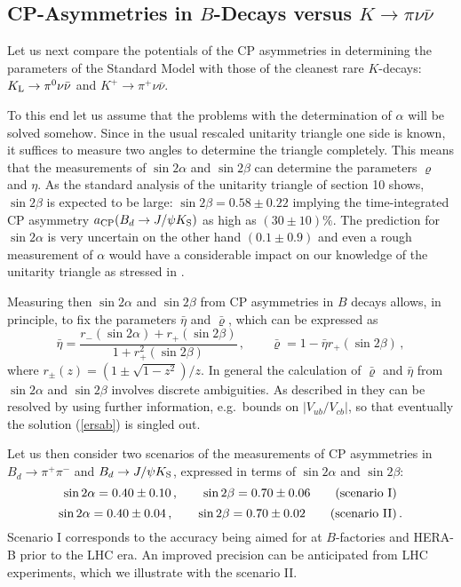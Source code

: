 \subsection{CP-Asymmetries in $B$-Decays versus $K \to \pi \nu\bar\nu$}
Let us next compare the potentials of the CP asymmetries in
determining the parameters of the Standard Model with those
of the cleanest rare $K$-decays: $K_{\rm L}\to\pi^0\nu\bar\nu$ and
$K^+\to\pi^+\nu\bar\nu$.

To this end let us assume that the problems with the determination
of $\alpha$ will be solved somehow. Since in the usual rescaled 
unitarity triangle  one side is known, it suffices to measure
two angles to determine the triangle completely. This means that
the measurements of $\sin 2\alpha$ and $\sin 2\beta$ can determine
the parameters $\varrho$ and $\eta$.
As the standard analysis of the unitarity triangle of section 10
shows, $\sin 2\beta$ is expected to be large: $\sin 2\beta=0.58\pm 0.22$
implying the time-integrated CP asymmetry  
$a_{\rm CP}(B_d\to J/\psi K_{\rm S})$
as high as $(30 \pm 10)\%$.
The prediction for $\sin 2\alpha$ is very
uncertain on the other hand $(0.1\pm0.9)$ and even a rough measurement
of $\alpha$ would have a considerable impact on our knowledge of
the unitarity triangle as stressed in \cite{BLO,BB96}.

Measuring then $\sin 2\alpha$ and $\sin 2\beta$ from CP asymmetries in
$B$ decays allows, in principle, to fix the 
parameters $\bar\eta$ and $\bar\varrho$, which can be expressed as
\cite{AJB94}
\begin{equation}\label{ersab}
\bar\eta=\frac{r_-(\sin 2\alpha)+r_+(\sin 2\beta)}{1+
r^2_+(\sin 2\beta)}\,,\qquad
\bar\varrho=1-\bar\eta r_+(\sin 2\beta)\,,
\end{equation}
where $r_\pm(z)=(1\pm\sqrt{1-z^2})/z$.
In general the calculation of $\bar\varrho$ and $\bar\eta$ from
$\sin 2\alpha$ and $\sin 2\beta$ involves discrete ambiguities.
As described in \cite{AJB94}
they can be resolved by using further information, e.g.\ bounds on
$|V_{ub}/V_{cb}|$, so that eventually the solution (\ref{ersab})
is singled out.

Let us then consider two scenarios of the measurements of CP asymmetries 
in $B_d\to\pi^+\pi^-$ and $B_d\to J/\psi K_{\rm S}$, expressed in terms 
of $\sin 2\alpha$ and
$\sin 2\beta$:
\begin{equation}\label{sin2a2bI}
\sin 2\alpha=0.40\pm 0.10\,, \qquad \sin 2\beta=0.70\pm 0.06
\qquad ({\rm scenario\ I})
\end{equation}
\begin{equation}\label{sin2a2bII}
\sin 2\alpha=0.40\pm 0.04\,, \qquad \sin 2\beta=0.70\pm 0.02
\qquad ({\rm scenario\ II})\,.
\end{equation}
Scenario I corresponds to the accuracy being aimed for at $B$-factories
and HERA-B prior to the LHC era. An improved precision can be anticipated from
LHC experiments, which we illustrate with the scenario II.

